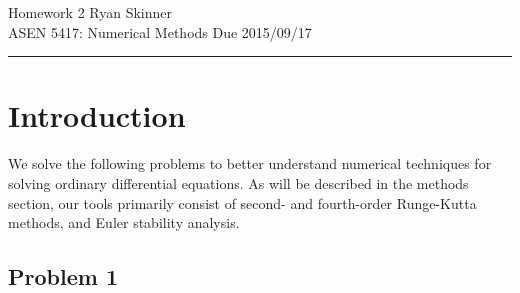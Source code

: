 \documentclass[12pt]{article}
\begin{document}
\pagestyle{fancyplain}
\lhead{}
\chead{}
\rhead{}
\cfoot{\thepage}

\noindent
{\Large Homework 2}
\hfill
{\large Ryan Skinner}
\\[0.5ex]
{\large ASEN 5417: Numerical Methods}
\hfill
{\large Due 2015/09/17}\\
\hrule
\vspace{6pt}

\section{Introduction} %

We solve the following problems to better understand numerical techniques for solving ordinary differential equations. As will be described in the methods section, our tools primarily consist of second- and fourth-order Runge-Kutta methods, and Euler stability analysis.

\subsection{Problem 1}
\end{document}
